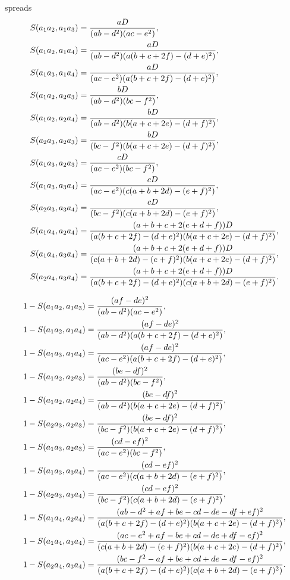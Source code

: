 \documentclass[11pt]{article}
\begin{document}
spreads 
\begin{align*}
S(a_{1}a_{2},a_{1}a_{3})& =\frac{aD}{(ab-d^{2})(ac-e^{2})}, \\
S(a_{1}a_{2},a_{1}a_{4})& =\frac{aD}{(ab-d^{2})(a(b+c+2f)-(d+e)^{2})}, \\
S(a_{1}a_{3},a_{1}a_{4})& =\frac{aD}{(ac-e^{2})(a(b+c+2f)-(d+e)^{2})}, \\
S(a_{1}a_{2},a_{2}a_{3})& =\frac{bD}{(ab-d^{2})(bc-f^{2})}, \\
S(a_{1}a_{2},a_{2}a_{4})& =\frac{bD}{(ab-d^{2})(b(a+c+2e)-(d+f)^{2})}, \\
S(a_{2}a_{3},a_{2}a_{3})& =\frac{bD}{(bc-f^{2})(b(a+c+2e)-(d+f)^{2})}, \\
S(a_{1}a_{3},a_{2}a_{3})& =\frac{cD}{(ac-e^{2})(bc-f^{2})}, \\
S(a_{1}a_{3},a_{3}a_{4})& =\frac{cD}{(ac-e^{2})(c(a+b+2d)-(e+f)^{2})}, \\
S(a_{2}a_{3},a_{3}a_{4})& =\frac{cD}{(bc-f^{2})(c(a+b+2d)-(e+f)^{2})}, \\
S(a_{1}a_{4},a_{2}a_{4})& =\frac{(a+b+c+2(e+d+f))D}{%
(a(b+c+2f)-(d+e)^{2})(b(a+c+2e)-(d+f)^{2})}, \\
S(a_{1}a_{4},a_{3}a_{4})& =\frac{(a+b+c+2(e+d+f))D}{%
(c(a+b+2d)-(e+f)^{2})(b(a+c+2e)-(d+f)^{2})}, \\
S(a_{2}a_{4},a_{3}a_{4})& =\frac{(a+b+c+2(e+d+f))D}{%
(a(b+c+2f)-(d+e)^{2})(c(a+b+2d)-(e+f)^{2})}.
\end{align*}

\begin{align*}
1-S(a_{1}a_{2},a_{1}a_{3})& =\frac{(af-de)^{2}}{(ab-d^{2})(ac-e^{2})}, \\
1-S(a_{1}a_{2},a_{1}a_{4})& =\frac{(af-de)^{2}}{%
(ab-d^{2})(a(b+c+2f)-(d+e)^{2})}, \\
1-S(a_{1}a_{3},a_{1}a_{4})& =\frac{(af-de)^{2}}{%
(ac-e^{2})(a(b+c+2f)-(d+e)^{2})}, \\
1-S(a_{1}a_{2},a_{2}a_{3})& =\frac{(be-df)^{2}}{(ab-d^{2})(bc-f^{2})}, \\
1-S(a_{1}a_{2},a_{2}a_{4})& =\frac{(be-df)^{2}}{%
(ab-d^{2})(b(a+c+2e)-(d+f)^{2})}, \\
1-S(a_{2}a_{3},a_{2}a_{3})& =\frac{(be-df)^{2}}{%
(bc-f^{2})(b(a+c+2e)-(d+f)^{2})}, \\
1-S(a_{1}a_{3},a_{2}a_{3})& =\frac{(cd-ef)^{2}}{(ac-e^{2})(bc-f^{2})}, \\
1-S(a_{1}a_{3},a_{3}a_{4})& =\frac{(cd-ef)^{2}}{%
(ac-e^{2})(c(a+b+2d)-(e+f)^{2})}, \\
1-S(a_{2}a_{3},a_{3}a_{4})& =\frac{(cd-ef)^{2}}{%
(bc-f^{2})(c(a+b+2d)-(e+f)^{2})}, \\
1-S(a_{1}a_{4},a_{2}a_{4})& =\frac{(ab-d^{2}+af+be-cd-de-df+ef)^{2}}{%
(a(b+c+2f)-(d+e)^{2})(b(a+c+2e)-(d+f)^{2})}, \\
1-S(a_{1}a_{4},a_{3}a_{4})& =\frac{(ac-e^{2}+af-be+cd-de+df-ef)^{2}}{%
(c(a+b+2d)-(e+f)^{2})(b(a+c+2e)-(d+f)^{2})}, \\
1-S(a_{2}a_{4},a_{3}a_{4})& =\frac{(bc-f^{2}-af+be+cd+de-df-ef)^{2}}{%
(a(b+c+2f)-(d+e)^{2})(c(a+b+2d)-(e+f)^{2})}.
\end{align*}
\end{document}
